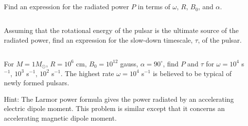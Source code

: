 \documentclass[11pt]{article}
\begin{document}
\subsection{}
Find an expression for the radiated power $P$ in terms of $\omega$,
$R$, $B_0$, and $\alpha$.

\subsection{}
Assuming that the rotational energy of the pulsar is the ultimate source
of the radiated power, find an expression for the slow-down timescale,
$\tau$, of the pulsar.

\subsection{}
For $M=1 M_\odot$, $R=10^6$ cm, $B_0=10^{12}$ gauss, $\alpha=90^\circ$,
find $P$ and $\tau$ for $\omega=10^4$ s$^{-1}$, $10^3$ s$^{-1}$,
$10^2$ s$^{-1}$.  The highest rate $\omega=10^4$ s$^{-1}$ is believed
to be typical of newly formed pulsars.

Hint: The Larmor power formula gives the power radiated by an accelerating
electric dipole moment. This problem is similar except that it concerns an
accelerating magnetic dipole moment.
\end{document}
